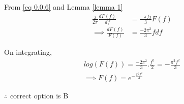 \documentclass[journal,12pt,twocolumn]{IEEEtran}
\begin{document}
        From \eqref{eq 0.0.6} and Lemma \ref{lemma 1} 
        \begin{align}
            \frac{j}{2\pi}\frac{dF(f)}{df} &= \frac{-\pi fj}{3} F(f)\\
           \implies \frac{dF(f)}{F(f)} &= \frac{-2\pi^2 }{3} f df
        \end{align}
        
        On integrating,
        \begin{align}
            log(F(f)) = \frac{-2\pi^2}{3}.\frac{f^2}{2} = -\frac{\pi^2 f^2}{3} \\
            \implies F(f) = e^{-\frac{\pi^2 f^2}{3}} 
        \end{align}
        
       $\therefore$ correct option is B
\end{document}
